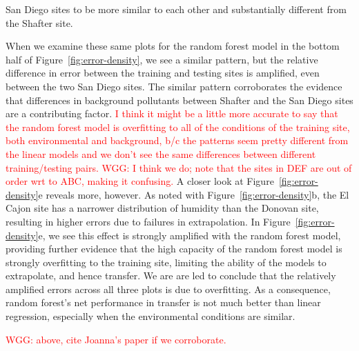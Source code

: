\documentclass[journal abbreviation, manuscript]{copernicus}
\newcommand\todo[1]{\textcolor{red}{#1}}
\begin{document}
San Diego sites to be more similar to each other and substantially different from the Shafter site.

When we examine these same plots for the random forest model in the bottom half of Figure~\ref{fig:error-density}, we see a similar pattern, but the relative difference in error between the training and testing sites is amplified, even between the two San Diego sites.  The similar pattern corroborates the evidence that differences in background pollutants between Shafter and the San Diego sites are a contributing factor. \todo{I think it might be a little more accurate to say that the random forest model is overfitting to all of the conditions of the training site, both environmental and background, b/c the patterns seem pretty different from the linear models and we don't see the same differences between different training/testing pairs.  WGG: I think we do; note that the sites in DEF are out of order wrt to ABC, making it confusing.}   A closer look at Figure~\ref{fig:error-density}e reveals more, however.  As noted with Figure~\ref{fig:error-density}b, the El Cajon site has a narrower distribution of humidity than the Donovan site, resulting in higher errors due to failures in extrapolation.  In Figure~\ref{fig:error-density}e, we see this effect is strongly amplified with the random forest model, providing further evidence that the high capacity of the random forest model is strongly overfitting to the training site, limiting the ability of the models to extrapolate, and hence transfer.  We are are led to conclude that the relatively amplified errors across all three plots is due to overfitting.  As a consequence, random forest's net performance in transfer is not much better than linear regression, especially when the environmental conditions are similar.

\todo{WGG: above, cite Joanna's paper if we corroborate.}

\end{document}
